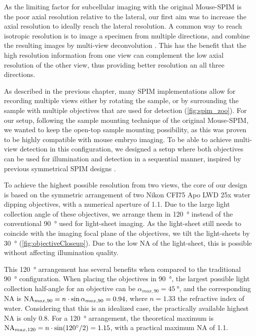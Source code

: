   As the limiting factor for subcellular imaging with the original Mouse-SPIM is the poor axial resolution relative to the lateral, our first aim was to increase the axial resolution to ideally reach the lateral resolution. A common way to reach isotropic resolution is to image a specimen from multiple directions, and combine the resulting images by multi-view deconvolution \cite{swoger_multi-view_2007,temerinac-ott_multiview_2012, preibisch_efficient_2014}. This has the benefit that the high resolution information from one view can complement the low axial resolution of the other view, thus providing better resolution an all three directions.

  As described in the previous chapter, many SPIM implementations allow for recording multiple views either by rotating the sample, or by surrounding the sample with multiple objectives that are used for detection (\autoref{fig:spim_zoo}). For our setup, following the sample mounting technique of the original Mouse-SPIM, we wanted to keep the open-top sample mounting possibility, as this was proven to be highly compatible with mouse embryo imaging. To be able to achieve multi-view detection in this configuration, we designed a setup where both objectives can be used for illumination and detection in a sequential manner, inspired by previous symmetrical SPIM designs \cite{balazs_development_2013, wu_spatially_2013}.

  To achieve the highest possible resolution from two views, the core of our design is based on the symmetric arrangement of two Nikon CFI75 Apo LWD 25x water dipping objectives, with a numerical aperture of 1.1. Due to the large light collection angle of these objectives, we arrange them in \SI{120}{\degree} instead of the conventional \SI{90}{\degree} used for light-sheet imaging. As the light-sheet still needs to coincide with the imaging focal plane of the objectives, we tilt the light-sheets by \SI{30}{\degree} (\autoref{fig:objectiveCloseup}). Due to the low NA of the light-sheet, this is possible without affecting illumination quality.

  This \SI{120}{\degree} arrangement has several benefits when compared to the traditional \SI{90}{\degree} configuration. When placing the objectives in \SI{90}{\degree}, the largest possible light collection half-angle for an objective can be $\alpha_{max,90} =\SI{45}{\degree}$, and the corresponding NA is $\operatorname{NA}_{max,90} = n \cdot \sin \alpha_{max,90} = 0.94$, where $n=1.33$ the refractive index of water. Considering that this is an idealized case, the practically available highest NA is only 0.8. For a \SI{120}{\degree} arrangement, the theoretical maximum is $\na_{max,120} = n \cdot \sin (\SI{120}{\degree} /2) = 1.15$, with a practical maximum NA of 1.1.

